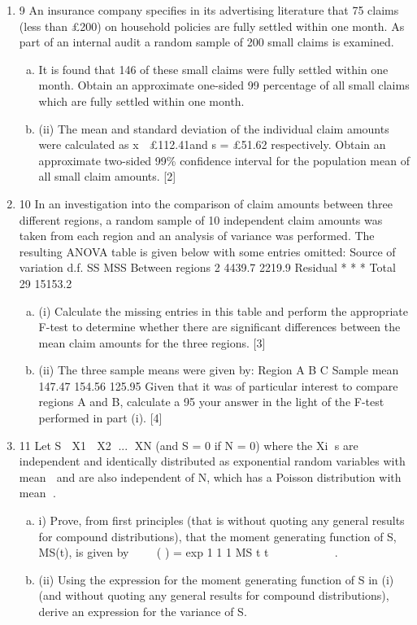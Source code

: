 \documentclass[a4paper,12pt]{article}
\begin{document}
\begin{enumerate}
\item 9 An insurance company specifies in its advertising literature that 75%
claims (less than £200) on household policies are fully settled within one month. As
part of an internal audit a random sample of 200 small claims is examined.
\begin{enumerate}[(a)]
    \item It is found that 146 of these small claims were fully settled within one month.
Obtain an approximate one-sided 99%
percentage of all small claims which are fully settled within one month. 
\item (ii) The mean and standard deviation of the individual claim amounts were
calculated as x  £112.41and s = £51.62 respectively. Obtain an approximate
two-sided 99\% confidence interval for the population mean of all small claim
amounts. [2]
\end{enumerate}
\item 10 In an investigation into the comparison of claim amounts between three different
regions, a random sample of 10 independent claim amounts was taken from each
region and an analysis of variance was performed. The resulting ANOVA table is
given below with some entries omitted:
Source of variation d.f. SS MSS
Between regions 2 4439.7 2219.9
Residual * * *
Total 29 15153.2
\begin{enumerate}[(a)]
    \item (i) Calculate the missing entries in this table and perform the appropriate F-test to
determine whether there are significant differences between the mean claim
amounts for the three regions. [3]
    \item (ii) The three sample means were given by:
Region A B C
Sample mean 147.47 154.56 125.95
Given that it was of particular interest to compare regions A and B, calculate a
95%
your answer in the light of the F-test performed in part (i). [4]
\end{enumerate}

\item 11 Let S  X1  X2 ... XN (and S = 0 if N = 0) where the Xi s are independent and
identically distributed as exponential random variables with mean  and are also
independent of N, which has a Poisson distribution with mean .
\begin{enumerate}[(a)]
    \item i) Prove, from first principles (that is without quoting any general results for
compound distributions), that the moment generating function of S, MS(t), is
given by    ( ) = exp 1 1 1 MS t t        	
. 
\item (ii) Using the expression for the moment generating function of S in (i) (and
without quoting any general results for compound distributions), derive an
expression for the variance of S. 
\end{enumerate}


\end{enumerate}
\end{document}
